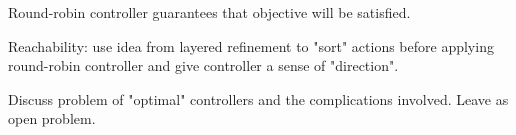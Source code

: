 Round-robin controller guarantees that objective will be satisfied.

Reachability: use idea from layered refinement to "sort" actions before applying round-robin controller and give controller a sense of "direction".

Discuss problem of "optimal" controllers and the complications involved.
Leave as open problem.

